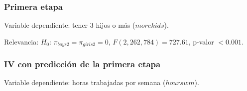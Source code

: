 \documentclass[t, compress, spanish, aspectratio=169]{beamer}
\begin{document}
\begin{frame}
	\frametitle{Primera etapa}
	\vspace*{-0.6em}
	Variable dependiente: tener 3 hijos o m\'as ($morekids$).
	\begin{center}
	\footnotesize\renewcommand{\arraystretch}{0.9}
	
	\end{center}
	\small
	Relevancia: $H_0$: $\pi_{boys2}=\pi_{girls2}=0$, $F(2, 262{,}784)=727.61$, p-valor $<0.001$.
\end{frame}
%
%
%
%
\begin{frame}
	\frametitle{IV con predicci\'on de la primera etapa}
	Variable dependiente: horas trabajadas por semana ($hourswm$).
	\begin{center}
	\footnotesize\renewcommand{\arraystretch}{0.9}
	
	\end{center}
\end{frame}
\end{document}
